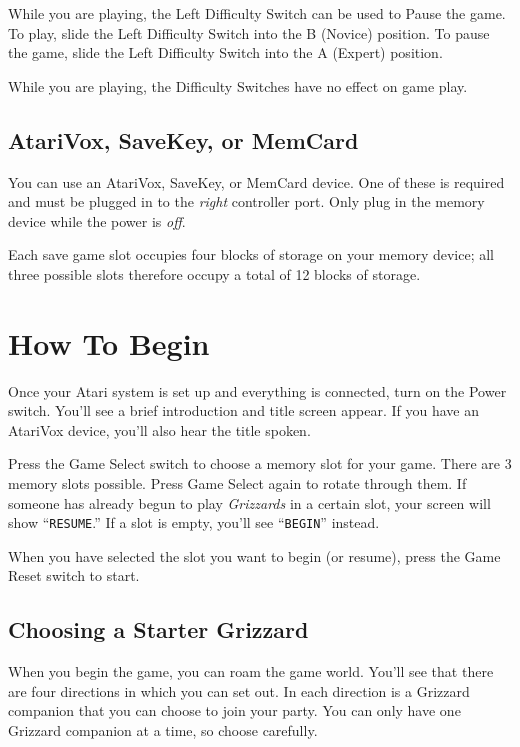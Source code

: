 \documentclass[12pt,twoside,openright,book]{memoir}
\begin{document}
\ifdefined\TVSECAM

While you are  playing, the Left Difficulty Switch can  be used to Pause
the  game.  To   play,  slide  the  Left  Difficulty   Switch  into  the
B (Novice) position. To pause the game, slide the Left Difficulty Switch
into the A (Expert) position.

\else

While  you  are playing,  the  Difficulty  Switches  have no  effect  on
game play.

\fi

\section{AtariVox, SaveKey, or MemCard}

You can  use an AtariVox,  SaveKey, or MemCard  device. One of  these is
required and  must be  plugged in to  the \emph{right}  controller port.
Only plug in the memory device while the power is \emph{off}.

Each  save game  slot occupies  four blocks  of storage  on your  memory
device; all three  possible slots therefore occupy a total  of 12 blocks
of storage.

\chapter{How To Begin}\label{How To Begin}

Once your  Atari system is set  up and everything is  connected, turn on
the  Power switch.  You'll see  a  brief introduction  and title  screen
appear.  If  you   have  an  AtariVox  device,  you'll   also  hear  the
title spoken.

Press the  Game Select  switch to  choose a memory  slot for  your game.
There are  3 memory slots  possible. Press  Game Select again  to rotate
through them. If someone has already begun to play \textit{Grizzards} in
a certain slot, your screen will  show ``\texttt{RESUME}.'' If a slot is
empty, you'll see ``\texttt{BEGIN}'' instead.

When you have selected the slot you want to begin (or resume), press the
Game Reset switch to start.

\section{Choosing a Starter Grizzard}

When you begin  the game, you can  roam the game world.  You'll see that
there are four directions in which you can set out. In each direction is
a Grizzard  companion that you  can choose to  join your party.  You can
only have one Grizzard companion at a time, so choose carefully.
\end{document}
